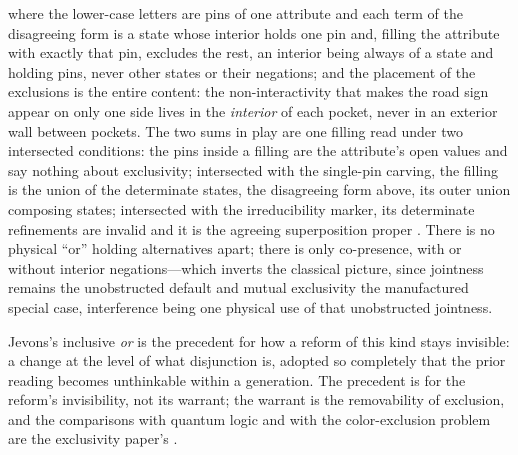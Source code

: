 \documentclass[11pt]{article}
\theoremstyle{definition}
\begin{document}
where the lower-case letters are pins of one attribute and each term of the disagreeing form is a state whose interior holds one pin and, filling the attribute with exactly that pin, excludes the rest, an interior being always of a state and holding pins, never other states or their negations; and the placement of the exclusions is the entire content: the non-interactivity that makes the road sign appear on only one side lives in the \emph{interior} of each pocket, never in an exterior wall between pockets. The two sums in play are one filling read under two intersected conditions: the pins inside a filling are the attribute's open values and say nothing about exclusivity; intersected with the single-pin carving, the filling is the union of the determinate states, the disagreeing form above, its outer union composing states; intersected with the irreducibility marker, its determinate refinements are invalid and it is the agreeing superposition proper \cite{Aethus}. There is no physical ``or'' holding alternatives apart; there is only co-presence, with or without interior negations---which inverts the classical picture, since jointness remains the unobstructed default and mutual exclusivity the manufactured special case, interference being one physical use of that unobstructed jointness.



Jevons's inclusive \emph{or} is the precedent for how a reform of this kind stays invisible: a change at the level of what disjunction is, adopted so completely that the prior reading becomes unthinkable within a generation. The precedent is for the reform's invisibility, not its warrant; the warrant is the removability of exclusion, and the comparisons with quantum logic and with the color-exclusion problem are the exclusivity paper's \cite{AethusUnion}.
\end{document}
